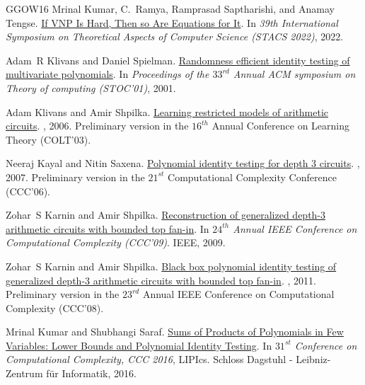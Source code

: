\documentclass[10pt,a4paper]{article}
\numberwithin{equation}{section}
\begin{document}
\begin{thebibliography}{GGOW16}
Mrinal Kumar, C.~Ramya, Ramprasad Saptharishi, and Anamay Tengse.
\newblock \href {http://dx.doi.org/10.4230/LIPIcs.STACS.2022.44} {{If VNP Is
  Hard, Then so Are Equations for It}}.
\newblock In {\em 39th International Symposium on Theoretical Aspects of
  Computer Science (STACS 2022)}, 2022.

Adam~R Klivans and Daniel Spielman.
\newblock \href{https://dl.acm.org/doi/10.1145/380752.380801}{Randomness
  efficient identity testing of multivariate polynomials}.
\newblock In {\em Proceedings of the $33^{rd}$ Annual ACM symposium on Theory
  of computing (STOC'01)}, 2001.

Adam Klivans and Amir Shpilka.
\newblock \href{https://theoryofcomputing.org/articles/v002a010/}{Learning
  restricted models of arithmetic circuits}.
, 2006.
\newblock Preliminary version in the $16^{th}$ Annual Conference on Learning
  Theory (COLT'03).

Neeraj Kayal and Nitin Saxena.
\newblock
  \href{https://link.springer.com/article/10.1007\%2Fs00037-007-0226-9}{Polynomial
  identity testing for depth 3 circuits}.
, 2007.
\newblock Preliminary version in the $21^{st}$ Computational Complexity
  Conference (CCC'06).

Zohar~S Karnin and Amir Shpilka.
\newblock \href{https://ieeexplore.ieee.org/document/5231339}{Reconstruction of
  generalized depth-3 arithmetic circuits with bounded top fan-in}.
\newblock In {\em $24^{th}$ Annual {IEEE} Conference on Computational
  Complexity (CCC'09)}. IEEE, 2009.

Zohar~S Karnin and Amir Shpilka.
\newblock
  \href{https://link.springer.com/article/10.1007/s00493-011-2537-3}{Black box
  polynomial identity testing of generalized depth-3 arithmetic circuits with
  bounded top fan-in}.
, 2011.
\newblock Preliminary version in the $23^{rd}$ Annual IEEE Conference on
  Computational Complexity (CCC'08).

Mrinal Kumar and Shubhangi Saraf.
\newblock \href{https://drops.dagstuhl.de/opus/volltexte/2016/5827/}{Sums of
  Products of Polynomials in Few Variables: Lower Bounds and Polynomial
  Identity Testing}.
\newblock In {\em $31^{st}$ Conference on Computational Complexity, {CCC}
  2016}, LIPIcs. Schloss Dagstuhl - Leibniz-Zentrum f{\"{u}}r Informatik, 2016.


\end{thebibliography}
\end{document}
